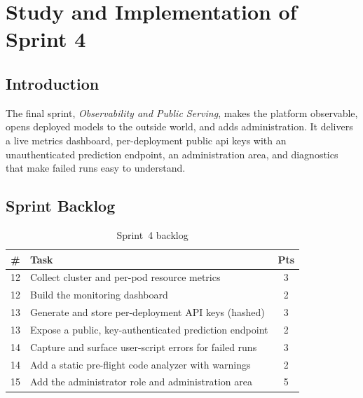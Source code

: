\chapter{Study and Implementation of Sprint 4}
\label{chap:sprint4}

\section*{Introduction}
The final sprint, \emph{Observability and Public Serving}, makes the platform
observable, opens deployed models to the outside world, and adds administration.
It delivers a live metrics dashboard, per-deployment public \gls{api} keys with an
unauthenticated prediction endpoint, an administration area, and diagnostics that
make failed runs easy to understand.

\section{Sprint Backlog}
\begin{table}[H]\centering
\renewcommand{\arraystretch}{1.25}
\caption{Sprint~4 backlog}\label{tab:backlog-s4}
\begin{tabularx}{\textwidth}{|c|X|c|}
\hline
\textbf{\#} & \textbf{Task} & \textbf{Pts}\\
\hline
12 & Collect cluster and per-pod resource metrics & 3\\ \hline
12 & Build the monitoring dashboard & 2\\ \hline
13 & Generate and store per-deployment API keys (hashed) & 3\\ \hline
13 & Expose a public, key-authenticated prediction endpoint & 2\\ \hline
14 & Capture and surface user-script errors for failed runs & 3\\ \hline
14 & Add a static pre-flight code analyzer with warnings & 2\\ \hline
15 & Add the administrator role and administration area & 5\\ \hline
\end{tabularx}
\end{table}

